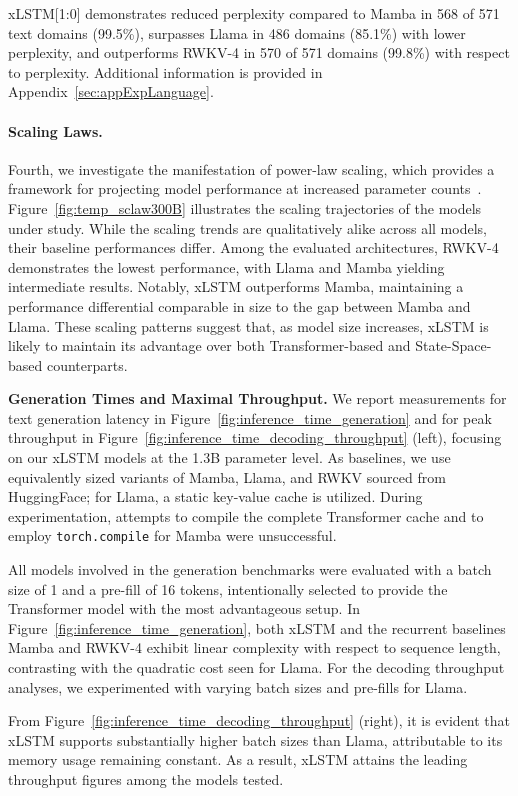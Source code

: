 xLSTM[1:0] demonstrates reduced perplexity compared to Mamba in 568 of 571 text domains (99.5\%), surpasses Llama in 486 domains (85.1\%) with lower perplexity, and outperforms RWKV-4 in 570 of 571 domains (99.8\%) with respect to perplexity. Additional information is provided in Appendix~\ref{sec:appExpLanguage}.

\paragraph{Scaling Laws.} Fourth, we investigate the manifestation of power-law scaling, which provides a framework for projecting model performance at increased parameter counts~\citep{Kaplan:20,Brown:20short}. Figure~\ref{fig:temp_sclaw300B} illustrates the scaling trajectories of the models under study. While the scaling trends are qualitatively alike across all models, their baseline performances differ. Among the evaluated architectures, RWKV-4 demonstrates the lowest performance, with Llama and Mamba yielding intermediate results. Notably, xLSTM outperforms Mamba, maintaining a performance differential comparable in size to the gap between Mamba and Llama. These scaling patterns suggest that, as model size increases, xLSTM is likely to maintain its advantage over both Transformer-based and State-Space-based counterparts.

\textbf{Generation Times and Maximal Throughput.} We report measurements for text generation latency in Figure~\ref{fig:inference_time_generation} and for peak throughput in Figure~\ref{fig:inference_time_decoding_throughput} (left), focusing on our xLSTM models at the 1.3B parameter level. As baselines, we use equivalently sized variants of Mamba, Llama, and RWKV sourced from HuggingFace; for Llama, a static key-value cache is utilized. During experimentation, attempts to compile the complete Transformer cache and to employ \texttt{torch.compile} for Mamba were unsuccessful.

All models involved in the generation benchmarks were evaluated with a batch size of 1 and a pre-fill of 16 tokens, intentionally selected to provide the Transformer model with the most advantageous setup. In Figure~\ref{fig:inference_time_generation}, both xLSTM and the recurrent baselines Mamba and RWKV-4 exhibit linear complexity with respect to sequence length, contrasting with the quadratic cost seen for Llama. For the decoding throughput analyses, we experimented with varying batch sizes and pre-fills for Llama.

From Figure~\ref{fig:inference_time_decoding_throughput} (right), it is evident that xLSTM supports substantially higher batch sizes than Llama, attributable to its memory usage remaining constant. As a result, xLSTM attains the leading throughput figures among the models tested.

